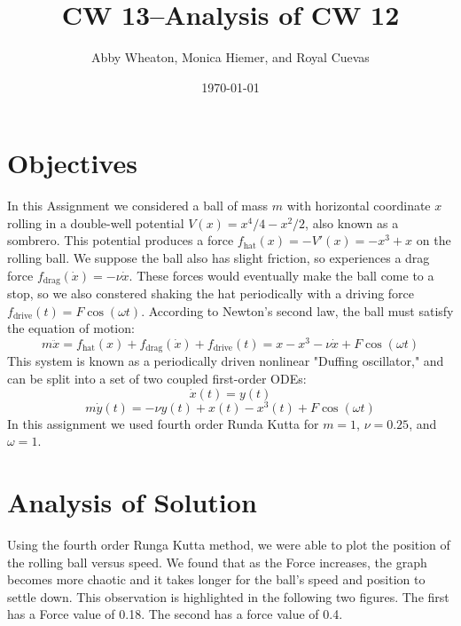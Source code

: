 \documentclass[aps,pra,notitlepage,amsmath,amssymb,letterpaper,12pt]{revtex4-1}
\begin{document}
 
\title{CW 13--Analysis of CW 12}
\author{Abby Wheaton, Monica Hiemer, and Royal Cuevas}
\date{\today}

\maketitle

\section{Objectives} %
In this Assignment we considered a ball of mass $m$ with horizontal coordinate $x$ rolling in a double-well potential $V(x) = x^4/4 - x^2/2$, also known as a sombrero. This potential produces a force $f_{\text{hat}}(x) = -V'(x) = -x^3 + x$ on the rolling ball. We suppose the ball also has slight friction, so experiences a drag force $f_{\text{drag}}(\dot{x}) = -\nu \dot{x}$. These forces would eventually make the ball come to a stop, so we also constered shaking the hat periodically with a driving force $f_{\text{drive}}(t) = F\cos(\omega t)$.
According to Newton's second law, the ball must satisfy the equation of motion: $$m\ddot{x} = f_{\text{hat}}(x) + f_{\text{drag}}(\dot{x}) + f_{\text{drive}}(t) = x - x^3 - \nu \dot{x} + F\cos(\omega t)$$ 
This system is known as a periodically driven nonlinear "Duffing oscillator," and can be split into a set of two coupled first-order ODEs:
$$\dot{x}(t) = y(t)$$
$$m\dot{y}(t) = -\nu y(t) + x(t) - x^3(t) + F\cos(\omega t)$$
In this assignment we used fourth order Runda Kutta for $m=1$, $\nu = 0.25$, and $\omega = 1$.


\section{Analysis of Solution}
Using the fourth order Runga Kutta method, we were able to plot the position of the rolling ball versus speed. We found that as the Force increases, the graph becomes more chaotic and it takes longer for the ball's speed and position to settle down. This observation is highlighted in the following two figures. The first has a Force value of 0.18. The second has a force value of 0.4.
\end{document}
